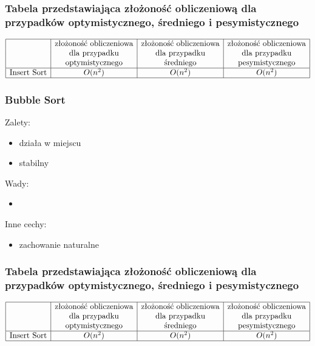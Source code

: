 \documentclass[polish,polish,a4paper]{article}
\begin{document}
\begin{spacing}{1.5}
	
	\subsubsection*{Tabela przedstawiająca złożoność obliczeniową dla przypadków optymistycznego, średniego i pesymistycznego} 
	\begin{equation*}
	\begin{array}{|l|c|c|c|}
	\hline
	&$złożoność obliczeniowa$&$złożoność obliczeniowa$&$złożoność obliczeniowa$\\
	&$dla przypadku$&$dla przypadku$&$dla przypadku$\\
	&$optymistycznego$&$średniego$&$pesymistycznego$\\
	\hline
	$Insert Sort$&O(n^2)&O(n^2)&O(n^2)\\
	\hline
	\end{array}
	\end{equation*}
	
	
			\subsubsection*{Bubble Sort}
	Zalety:
	\begin{itemize}
		\item działa w miejscu
		\item stabilny 
	\end{itemize}
	Wady:
	\begin{itemize}
		\item 
	\end{itemize}
	Inne cechy:
	\begin{itemize}
		\item zachowanie naturalne
	\end{itemize}
	
	
	\subsubsection*{Tabela przedstawiająca złożoność obliczeniową dla przypadków optymistycznego, średniego i pesymistycznego} 
	\begin{equation*}
	\begin{array}{|l|c|c|c|}
	\hline
	&$złożoność obliczeniowa$&$złożoność obliczeniowa$&$złożoność obliczeniowa$\\
	&$dla przypadku$&$dla przypadku$&$dla przypadku$\\
	&$optymistycznego$&$średniego$&$pesymistycznego$\\
	\hline
	$Insert Sort$&O(n^2)&O(n^2)&O(n^2)\\
	\hline
	\end{array}
	\end{equation*}
	
\end{spacing}
	
	\newpage
	\tableofcontents
\end{document}

